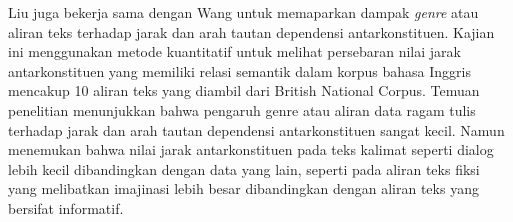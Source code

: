 Liu juga bekerja sama dengan Wang \citep{wang2017effects} untuk memaparkan dampak \textit{genre} atau aliran teks terhadap jarak dan arah tautan dependensi antarkonstituen. Kajian ini menggunakan metode kuantitatif untuk melihat persebaran nilai jarak antarkonstituen yang memiliki relasi semantik dalam korpus bahasa Inggris mencakup 10 aliran teks yang diambil dari British National Corpus. Temuan penelitian menunjukkan bahwa pengaruh genre atau aliran data ragam tulis terhadap jarak dan arah tautan dependensi antarkonstituen sangat kecil. Namun \cite{wang2017effects} menemukan bahwa nilai jarak antarkonstituen pada teks kalimat seperti dialog lebih kecil dibandingkan dengan data yang lain, seperti pada aliran teks fiksi yang melibatkan imajinasi lebih besar dibandingkan dengan aliran teks yang bersifat informatif.

